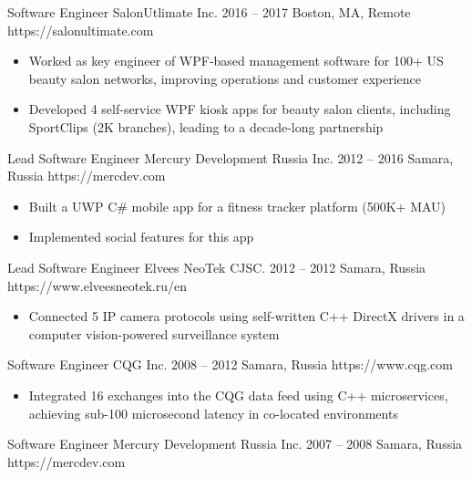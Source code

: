 \documentclass[9pt,a4paper]{juicv}
\begin{document}
\begin{paracol}{2}
    \cvLeftEvent
        {Software Engineer}
        {SalonUtlimate Inc.}
        {2016 -- 2017}
        {Boston, MA, Remote}
        {https://salonultimate.com}

        \begin{itemize}
            \item Worked as key engineer of WPF-based management software
                  for 100+ US beauty salon networks, improving operations and customer experience
            \item Developed 4 self-service WPF kiosk apps for beauty salon clients,
                  including SportClips (2K branches), leading to a decade-long partnership
        \end{itemize}

    \cvLeftEvent
        {Lead Software Engineer}
        {Mercury Development Russia Inc.}
        {2012 -- 2016}
        {Samara, Russia}
        {https://mercdev.com}

        \begin{itemize}
            \item Built a UWP C\# mobile app for a fitness tracker platform (500K+ MAU)
            \item Implemented social features for this app
        \end{itemize}

    \cvLeftEvent
        {Lead Software Engineer}
        {Elvees NeoTek CJSC.}
        {2012 -- 2012}
        {Samara, Russia}
        {https://www.elveesneotek.ru/en}

        \begin{itemize}
            \item Connected 5 IP camera protocols using self-written C++ DirectX drivers
                  in a computer vision-powered surveillance system
        \end{itemize}

    \cvLeftEvent
        {Software Engineer}
        {CQG Inc.}
        {2008 -- 2012}
        {Samara, Russia}
        {https://www.cqg.com}

        \begin{itemize}
            \item Integrated 16 exchanges into the CQG data feed using C++ microservices,
                  achieving sub-100 microsecond latency in co-located environments
        \end{itemize}

    \cvLeftEvent
        {Software Engineer}
        {Mercury Development Russia Inc.}
        {2007 -- 2008}
        {Samara, Russia}
        {https://mercdev.com}


\end{paracol}
\end{document}
